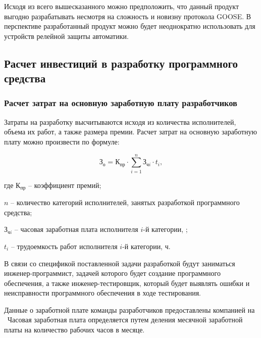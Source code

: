 Исходя из всего вышесказанного можно предположить, что данный продукт выгодно
разрабатывать несмотря на сложность и новизну протокола GOOSE. В перспективе
разработанный продукт можно будет неоднократно использовать для устройств релейной
защиты автоматики.

\subsection{Расчет инвестиций в разработку программного средства}

\subsubsection{Расчет затрат на основную заработную плату разработчиков}

Затраты на разработку высчитываются исходя из количества исполнителей, объема их
работ, а также размера премии. Расчет затрат на основную заработную плату можно
произвести по формуле:

\begin{equation}
  \label{eq:econ:Zo}
  \text{З}_\text{о} = \text{К}_\text{пр} \cdot
    \sum_{i = 1}^{n} \text{З}_{\text{ч}i} \cdot t_i,
\end{equation}
\begin{explanationx}
  \item[где] $ \text{К}_\text{пр} $ -- коэффициент премий;
  \item $ n $ -- количество категорий исполнителей, занятых разработкой
  программного средства;
  \item $ \text{З}_{\text{ч}i} $ -- часовая заработная плата исполнителя $ i $-й категории, \rub;
  \item $ t_i $ -- трудоемкость работ исполнителя $ i $-й категории, ч.
\end{explanationx}

В связи со спецификой поставленной задачи разработкой будут заниматься
инженер-программист, задачей которого будет создание программного обеспечения,
а также инженер-тестировщик, который будет выявлять ошибки и неисправности
программного обеспечения в ходе тестирования.

Данные о заработной плате команды разработчиков предоставлены компанией на
\econCalcDate\ Часовая заработная плата определяется путем деления месячной
заработной платы на количество рабочих часов в месяце.


